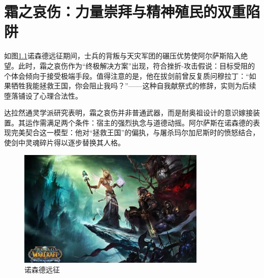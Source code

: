 \chapter{霜之哀伤：力量崇拜与精神殖民的双重陷阱}

\hspace*{2em}如图\ref{fig:northrend}诺森德远征期间，士兵的背叛与天灾军团的碾压优势使阿尔萨斯陷入绝望。此时，霜之哀伤作为“终极解决方案”出现，符合挫折-攻击假说\cite{dollard1939}：目标受阻的个体会倾向于接受极端手段。值得注意的是，他在拔剑前曾反复质问穆拉丁：“如果牺牲我能拯救王国，你会阻止我吗？”——这种自我献祭式的修辞，实则为后续堕落铺设了心理合法性。

达拉然通灵学派研究表明，霜之哀伤并非普通武器，而是耐奥祖设计的意识嫁接装置。其运作需满足两个条件\cite{kelthuzad2025}：宿主的强烈执念与道德动摇。阿尔萨斯在诺森德的表现完美契合这一模型：他对“拯救王国”的偏执，与屠杀玛尔加尼斯时的愤怒结合，使剑中灵魂碎片得以逐步替换其人格。

\begin{figure}[ht]
    \centering
    \includegraphics[width=0.8\textwidth]{figures/诺森德.jpg}
    \caption{诺森德远征}
    \label{fig:northrend}
\end{figure}